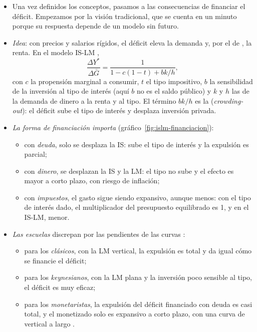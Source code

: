 \documentclass[11pt]{article}
\begin{document}
\begin{itemize}
\item Una vez definidos los conceptos, pasamos a las consecuencias de financiar el déficit. Empezamos por la visión tradicional, que se cuenta en un minuto porque su respuesta depende de un modelo sin futuro.
\item \emph{Idea}: con precios y salarios rígidos, el déficit eleva la demanda y, por el  de \textcite{Kahn1931Relation}, la renta. En el modelo IS-LM ,
  \begin{equation*}
  \frac{\Delta Y^*}{\Delta\bar G}=\frac{1}{1-c(1-t)+bk/h},
  \end{equation*}
  con $c$ la propensión marginal a consumir, $t$ el tipo impositivo, $b$ la sensibilidad de la inversión al tipo de interés (aquí $b$ no es el saldo público) y $k$ y $h$ las de la demanda de dinero a la renta y al tipo. El término $bk/h$ es la  (\emph{crowding-out}): el déficit sube el tipo de interés y desplaza inversión privada.
\item \emph{La forma de financiación importa} (gráfico~\ref{fig:islm-financiacion}):
  \begin{itemize}
  \item con \emph{deuda}, solo se desplaza la IS: sube el tipo de interés y la expulsión es parcial;
  \item con \emph{dinero}, se desplazan la IS y la LM: el tipo no sube y el efecto es mayor a corto plazo, con riesgo de inflación;
  \item con \emph{impuestos}, el gasto sigue siendo expansivo, aunque menos: con el tipo de interés dado, el multiplicador del presupuesto equilibrado es 1\nocite{Haavelmo1945Multiplier}, y en el IS-LM, menor.
  \end{itemize}
\item \emph{Las escuelas} discrepan por las pendientes de las curvas  :
  \begin{itemize}
  \item para los \emph{clásicos}, con la LM vertical, la expulsión es total y da igual cómo se financie el déficit;
  \item para los \emph{keynesianos}, con la LM plana y la inversión poco sensible al tipo, el déficit es muy eficaz;
  \item para los \emph{monetaristas}, la expulsión del déficit financiado con deuda es casi total, y el monetizado solo es expansivo a corto plazo, con una curva de  vertical a largo .

\end{itemize}
\end{itemize}
\end{document}
